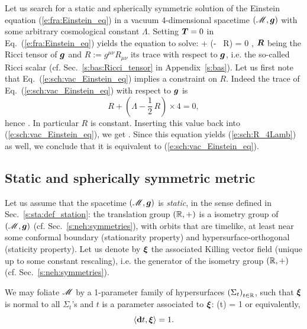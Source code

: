 Let us search for a static and spherically symmetric solution of the
Einstein equation (\ref{e:fra:Einstein_eq}) in a vacuum
4-dimensional spacetime $(\mathscr{M},\bm{g})$ with some arbitrary cosmological constant
$\Lambda$. Setting $\bm{T}=0$ in Eq.~(\ref{e:fra:Einstein_eq}) yields
the equation to solve:
\be \label{e:sch:vac_Einstein_eq}
      + \left(\Lambda - \, R\right)  = 0 ,
\ee
$\bm{R}$ being the Ricci tensor of $\bm{g}$ and $R:=g^{\mu\nu} R_{\mu\nu}$ its
trace with respect to $\bm{g}$, i.e. the so-called Ricci scalar
(cf. Sec.~\ref{s:bas:Ricci_tensor} in Appendix~\ref{s:bas}).
Let us first note that Eq.~(\ref{e:sch:vac_Einstein_eq}) implies a
constraint on $R$. Indeed the trace of Eq.~(\ref{e:sch:vac_Einstein_eq})
with respect to $\bm{g}$ is
\[
    R + \left(\Lambda - \frac{1}{2}\, R\right) \times 4 = 0 ,
\]
hence
\be \label{e:sch:R_4Lamb}
     .
\ee
In particular $R$ is constant.
Inserting this value back into (\ref{e:sch:vac_Einstein_eq}), we get
\be \label{e:sch:vac_Einstein_eq_Lamb}
     .
\ee
Since this equation yields (\ref{e:sch:R_4Lamb}) as well, we conclude
that it is equivalent to (\ref{e:sch:vac_Einstein_eq}).

\subsection{Static and spherically symmetric metric} \label{s:sch:static_spher}

Let us assume that the spacetime $(\mathscr{M},\bm{g})$ is \emph{static}, in the sense defined in Sec.~\ref{s:sta:def_station}:
the translation group $(\mathbb{R},+)$ is a isometry group of $(\mathscr{M},\bm{g})$
(cf. Sec.~\ref{s:neh:symmetries}), with orbits that are timelike, at least near
some conformal boundary (stationarity property) and hypersurface-orthogonal (staticity property). Let us denote by $\bm{\xi}$ the associated Killing vector
field (unique up to some constant rescaling), i.e. the generator of the
isometry group $(\mathbb{R},+)$ (cf. Sec.~\ref{s:neh:symmetries}).

We may foliate $\mathscr{M}$ by a 1-parameter family of hypersurfaces
$\left(\Sigma_t\right)_{t\in\mathbb{R}}$, such that $\bm{\xi}$ is normal to
all $\Sigma_t$'s and $t$ is a parameter associated to $\bm{\xi}$:
\be \label{e:sch:xi_t}
    \w{\xi}(t) = 1
\ee
or equivalently,
\[
    \langle \mathbf{d} t , \bm{\xi} \rangle = 1.
\]

